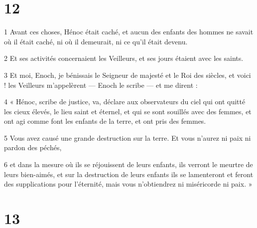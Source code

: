 \chapter{12}

\par 1 Avant ces choses, Hénoc était caché, et aucun des enfants des hommes ne savait où il était caché, ni où il demeurait, ni ce qu'il était devenu.
\par 2 Et ses activités concernaient les Veilleurs, et ses jours étaient avec les saints.
\par 3 Et moi, Enoch, je bénissais le Seigneur de majesté et le Roi des siècles, et voici ! les Veilleurs m'appelèrent — Enoch le scribe — et me dirent :
\par 4 « Hénoc, scribe de justice, va, déclare aux observateurs du ciel qui ont quitté les cieux élevés, le lieu saint et éternel, et qui se sont souillés avec des femmes, et ont agi comme font les enfants de la terre, et ont pris des femmes.
\par 5 Vous avez causé une grande destruction sur la terre. Et vous n'aurez ni paix ni pardon des péchés,
\par 6 et dans la mesure où ils se réjouissent de leurs enfants, ils verront le meurtre de leurs bien-aimés, et sur la destruction de leurs enfants ils se lamenteront et feront des supplications pour l'éternité, mais vous n'obtiendrez ni miséricorde ni paix. »

\chapter{13}

